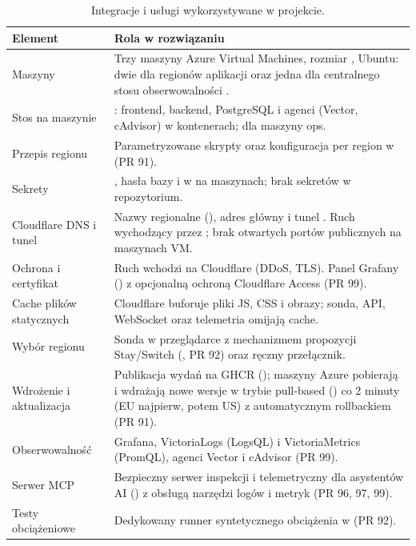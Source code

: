 \begin{table}[H]
\centering\small
\begin{tabularx}{\textwidth}{@{}lY@{}}
\toprule
\textbf{Element} & \textbf{Rola w rozwiązaniu} \\
\midrule
Maszyny & Trzy maszyny Azure Virtual Machines, rozmiar , Ubuntu: dwie dla regionów aplikacji oraz jedna dla centralnego stosu obserwowalności . \\
Stos na maszynie & : frontend, backend, PostgreSQL i agenci (Vector, cAdvisor) w kontenerach;  dla maszyny ops. \\
Przepis regionu & Parametryzowane skrypty  oraz konfiguracja per region w  (PR 91). \\
Sekrety & , hasła bazy i  w  na maszynach; brak sekretów w repozytorium. \\
Cloudflare DNS i tunel & Nazwy regionalne (), adres główny i tunel . Ruch wychodzący przez ; brak otwartych portów publicznych na maszynach VM. \\
Ochrona i certyfikat & Ruch wchodzi na Cloudflare (DDoS, TLS). Panel Grafany () z opcjonalną ochroną Cloudflare Access (PR 99). \\
Cache plików statycznych & Cloudflare buforuje pliki JS, CSS i obrazy; sonda, API, WebSocket oraz telemetria omijają cache. \\
Wybór regionu & Sonda w przeglądarce z mechanizmem propozycji Stay/Switch (, PR 92) oraz ręczny przełącznik. \\
Wdrożenie i aktualizacja & Publikacja wydań na GHCR (); maszyny Azure pobierają i wdrażają nowe wersje w trybie pull-based () co 2 minuty (EU najpierw, potem US) z automatycznym rollbackiem (PR 91). \\
Obserwowalność & Grafana, VictoriaLogs (LogsQL) i VictoriaMetrics (PromQL), agenci Vector i cAdvisor (PR 99). \\
Serwer MCP & Bezpieczny serwer inspekcji i telemetryczny dla asystentów AI () z obsługą narzędzi logów i metryk (PR 96, 97, 99). \\
Testy obciążeniowe & Dedykowany runner syntetycznego obciążenia w  (PR 92). \\
\bottomrule
\end{tabularx}
\caption{Integracje i usługi wykorzystywane w projekcie.}
\end{table}

